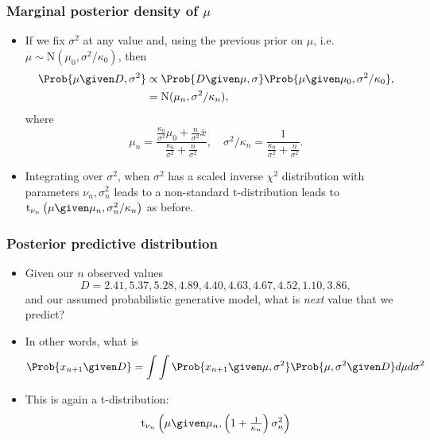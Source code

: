 \documentclass{slides}
\begin{document}
\begin{frame}
	\frametitle{Marginal posterior density of $\mu$}
	\begin{itemize}
		\item If we fix $\sigma^2$ at any value and, using the previous prior on $\mu$, i.e. $\mu \sim \textrm{N}(\mu_0, \sigma^2/\kappa_0)$, then 
			\begin{align*}
				\Prob{\mu \given D, \sigma^2} &\propto \Prob{D\given\mu, \sigma}\Prob{\mu\given \mu_0, \sigma^2/\kappa_0},\\
				&= \textrm{N}(\mu_n, \sigma^2/\kappa_n),
			\end{align*}
			where 
			\[
				\mu_n = \frac{\tfrac{\kappa_0}{\sigma^2}\mu_0 + \tfrac{n}{\sigma^2}\bar{x}}{\tfrac{\kappa_0}{\sigma^2} + \tfrac{n}{\sigma^2}},\quad
				\sigma^2/\kappa_n = \frac{1}{\tfrac{\kappa_0}{\sigma^2} + \tfrac{n}{\sigma^2}}.
			\]
		\item Integrating over $\sigma^2$, when $\sigma^2$ has a scaled inverse $\chi^2$ distribution with parameters $\nu_n, \sigma^2_n$ leads to a non-standard t-distribution
			leads to $\textrm{t}_{\nu_n}\left(\mu \given \mu_n, \sigma^2_n/\kappa_n\right)$ as before.
	\end{itemize}
\end{frame}

\begin{frame}
	\frametitle{Posterior predictive distribution}
	\begin{itemize}
		\item Given our $n$ observed values
			\[	D = 2.41, 5.37, 5.28, 4.89, 4.40, 4.63, 4.67, 4.52, 1.10, 3.86, \]
			and our assumed probabilistic generative model, what is \emph{next} value that we predict?
		\item In other words, what is
			\[
				\Prob{x_{n+1} \given D} = \int\int\Prob{x_{n+1}\given \mu, \sigma^2}\Prob{\mu, \sigma^2\given D} d\mu d\sigma^2
			\]
		\item This is again a t-distribution:
			\[
				\textrm{t}_{\nu_n}\left(\mu \given \mu_n, \left(1 + \tfrac{1}{\kappa_n}\right)\sigma^2_n\right)
			\]
	\end{itemize}
\end{frame}
\end{document}
